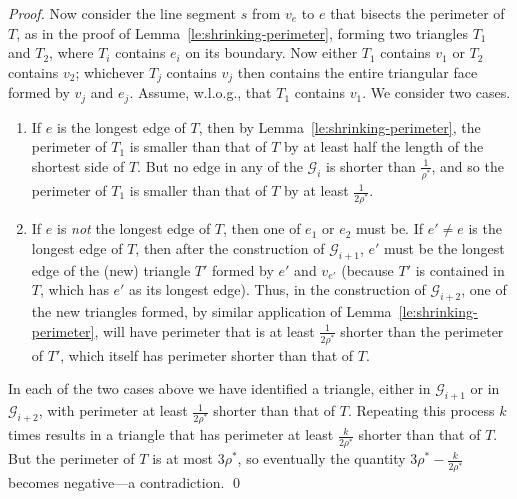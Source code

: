 \documentclass[orivec]{llncs}
\begin{document}
\begin{proof}
Now consider the line segment $s$ from $v_e$ to $e$
that bisects the perimeter of $T$, as in the proof of Lemma~\ref{le:shrinking-perimeter}, forming
two triangles $T_1$ and $T_2$, where $T_i$ contains $e_i$ on its boundary.
Now either $T_1$ contains $v_1$ or $T_2$ contains $v_2$; whichever $T_j$ contains $v_j$ then
contains the entire triangular face formed by $v_j$ and $e_j$.
Assume, w.l.o.g., that $T_1$ contains $v_1$. We consider two cases.
\begin{enumerate}
\item If $e$ is the longest edge of $T$, then by Lemma~\ref{le:shrinking-perimeter}, the perimeter
of $T_1$ is smaller than that of $T$ by at least half the length of the shortest side of $T$.
But no edge in any of the $\mathcal{G}_i$ is shorter than $\frac{1}{\rho^*}$, and so the perimeter of $T_1$ is
smaller than that of $T$ by at least $\frac{1}{2\rho^*}$.
\item If $e$ is {\em not} the longest edge of $T$, then one of $e_1$ or $e_2$ must be.
If $e' \not= e$ is the longest edge of $T$, then after the construction of $\mathcal{G}_{i+1}$, $e'$ must
be the longest edge of the (new) triangle $T'$ formed by $e'$ and $v_{e'}$ (because $T'$
is contained in $T$, which has $e'$ as its longest edge).
Thus, in the construction of $\mathcal{G}_{i+2}$, one of the new triangles formed, by similar
application of Lemma~\ref{le:shrinking-perimeter}, will have perimeter that is at least
$\frac{1}{2\rho^*}$ shorter than the perimeter of $T'$, which itself has perimeter shorter than
that of $T$.
\end{enumerate}

In each of the two cases above we have identified a triangle, either in $\mathcal{G}_{i+1}$ or in
$\mathcal{G}_{i+2}$,
with perimeter at least $\frac{1}{2\rho^*}$ shorter than that of $T$.
Repeating this process $k$ times results in a triangle that has perimeter at least
$\frac{k}{2\rho^*}$ shorter than that of $T$.
But the perimeter of $T$ is at most $3 \rho^*$, so eventually the quantity
$3 \rho^* - \frac{k}{2\rho^*}$ becomes negative---a contradiction. \qed
\end{proof}
\end{document}
